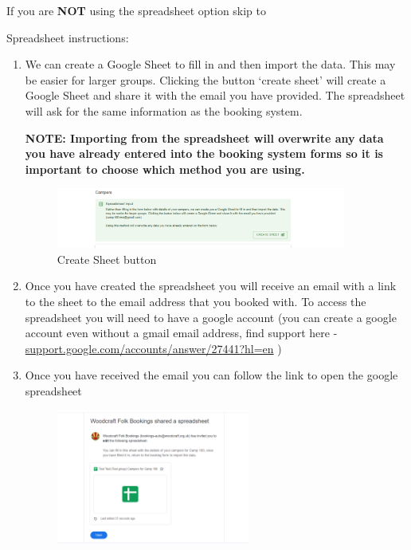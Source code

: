 \documentclass[a4paper, 11pt]{report}
\begin{document}
\begin{enumerate}
    If you are \textbf{NOT} using the spreadsheet option skip to 

    Spreadsheet instructions:
    \begin{enumerate}
        \item We can create a Google Sheet to fill in and then import the data. This may be easier for larger groups. Clicking the button `create sheet' will create a Google Sheet and share it with the email you have provided. The spreadsheet will ask for the same information as the booking system. 
        
        \textbf{NOTE: Importing from the spreadsheet will overwrite any data you have already entered into the booking system forms so it is important to choose which method you are using.}
        \begin{figure}[H]
            \centering
            \includegraphics[width=0.9\textwidth]{assets/2-spreadsheet-option.png}
            \caption{Create Sheet button}
        \end{figure}
        \item Once you have created the spreadsheet you will receive an email with a link to the sheet to the email address that you booked with. To access the spreadsheet you will need to have a google account (you can create a google account even without a gmail email address, find support here - \href{https://support.google.com/accounts/answer/27441?hl=en}{support.google.com/accounts/answer/27441?hl=en} ) 
        \item Once you have received the email you can follow the link to open the google spreadsheet
         \begin{figure}[H]
            \centering
            \includegraphics[width=0.6\textwidth]{assets/2-spreadsheet-email.png}

\end{figure}
\end{enumerate}
\end{enumerate}
\end{document}
